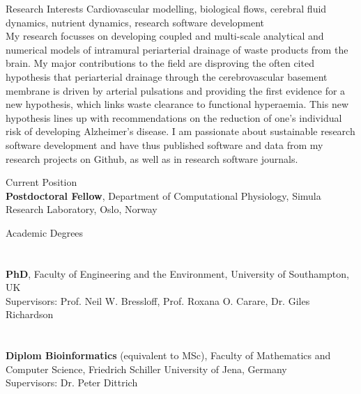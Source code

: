 \documentclass[margin,line,10pt]{res}
\begin{document}

\address{alexandra.diem@gmail.com, \url{https://www.akdiem.com}, \url{https://github.com/akdiem}}

\begin{resume}

{\sc Research Interests} Cardiovascular modelling, biological flows, cerebral fluid dynamics, nutrient dynamics, research software development\\

My research focusses on developing coupled and multi-scale analytical and numerical models of intramural periarterial drainage of waste products from the brain. My major contributions to the field are disproving the often cited hypothesis that periarterial drainage through the cerebrovascular basement membrane is driven by arterial pulsations and providing the first evidence for a new hypothesis, which links waste clearance to functional hyperaemia. This new hypothesis lines up with recommendations on the reduction of one's individual risk of developing Alzheimer's disease. I am passionate about sustainable research software development and have thus published software and data from my research projects on Github, as well as in research software journals.\\

\vspace*{-.2in}

{\sc Current Position}\\
{\bf Postdoctoral Fellow}, Department of Computational Physiology, Simula Research Laboratory, Oslo, Norway\\

\vspace*{-.2in}

{\sc Academic Degrees}\\
\vspace*{-.35in}
\section{}{\bf PhD}, Faculty of Engineering and the Environment, University of Southampton, UK\\
Supervisors: Prof. Neil W. Bressloff, Prof. Roxana O. Carare, Dr. Giles Richardson\\
\vspace*{-.35in}
\section{}{\bf Diplom Bioinformatics} (equivalent to MSc), Faculty of Mathematics and Computer Science, Friedrich Schiller University of Jena, Germany\\
Supervisors: Dr. Peter Dittrich\\


\end{resume}
\end{document}
